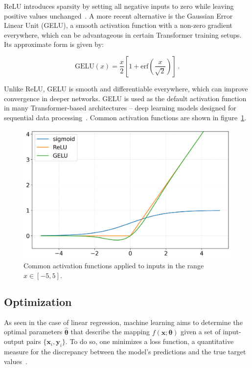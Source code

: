 ReLU introduces sparsity by setting all negative inputs to zero while leaving positive values unchanged~\cite{lecun_efficient_2012, Nair_2010, Krizhevsky_2012}. 
A more recent alternative is the Gaussian Error Linear Unit (GELU), a smooth activation function with a non-zero gradient everywhere, which can be advantageous in certain Transformer training setups. Its approximate form is given by:

\begin{equation}
\label{eq:GELU}
	\mathrm{GELU}(x) = \frac{x}{2} \left[ 1 + \mathrm{erf} \left( \frac{x}{\sqrt{2}} \right) \right] \,.
\end{equation}

Unlike ReLU, GELU is smooth and differentiable everywhere, which can improve convergence in deeper networks. GELU is used as the default activation function in many Transformer-based architectures -- deep learning models designed for sequential data processing~\cite{hendrycks_gaussian_2023}. Common activation functions are shown in figure~\ref{fig:Activation_functions}. 

\begin{figure}
    \centering
    \includegraphics[width=0.7\linewidth]{figures/04_transformer/Activation_functions.png}
    \caption{Common activation functions applied to inputs in the range $x \in [-5, 5]$.}
\label{fig:Activation_functions}
\end{figure}


\subsection{Optimization}
\label{sec:03_optimization}

As seen in the case of linear regression, machine learning aims to determine the optimal parameters $\hat{\boldsymbol{\theta}}$ that describe the mapping $f(\mathbf{x}; \boldsymbol{\theta})$ given a set of input-output pairs $\{\mathbf{x}_i, \mathbf{y}_i\}$. To do so, one minimizes a loss function, a quantitative measure for the discrepancy between the model's predictions and the true target values~\cite{prince_understanding_2023}.  

